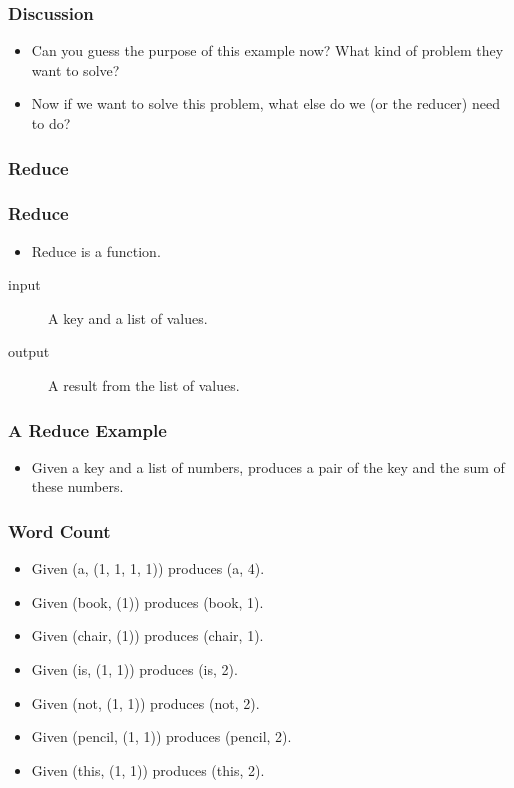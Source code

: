 \documentclass{beamer}
\begin{document}
\begin{frame}
  \frametitle{Discussion}
  \begin{itemize}
    \item Can you guess the purpose of this example now? What kind of
      problem they want to solve?
    \item Now if we want to solve this problem, what else do we (or
      the reducer) need to do?
  \end{itemize}
\end{frame}

\subsubsection{Reduce}

\begin{frame}
  \frametitle{Reduce}
  \begin{itemize}
    \item Reduce is a function.
  \end{itemize}
  \begin{description}
  \item[input] A key and a list of values.
  \item[output] A result from the list of values.
  \end{description}
\end{frame}

\begin{frame}
  \frametitle{A Reduce Example} 
  \begin{itemize}
    \item Given a key and a list of numbers, produces a pair of the
      key and the sum of these numbers.
  \end{itemize}
\end{frame}

\begin{frame}
  \frametitle{Word Count} 
  \begin{itemize}
    \item Given (a, (1, 1, 1, 1)) produces (a, 4).
    \item Given (book, (1)) produces (book, 1).
    \item Given (chair, (1)) produces (chair, 1).
    \item Given (is, (1, 1)) produces (is, 2).
    \item Given (not, (1, 1)) produces (not, 2).
    \item Given (pencil, (1, 1)) produces (pencil, 2).
    \item Given (this, (1, 1)) produces (this, 2).
  \end{itemize}
\end{frame}
\end{document}
